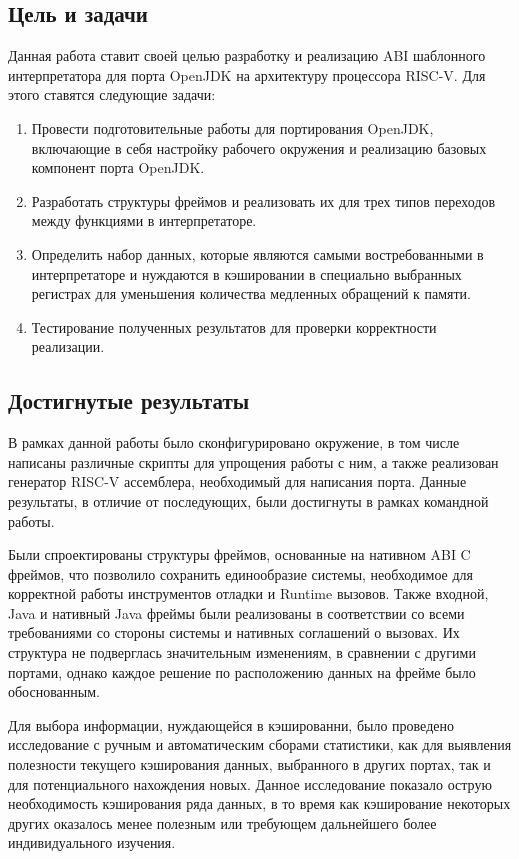 \subsection*{Цель и задачи}

Данная работа ставит своей целью разработку и реализацию ABI шаблонного интерпретатора для порта OpenJDK на архитектуру процессора RISC-V. Для этого ставятся следующие задачи:

\begin{enumerate}
    \item Провести подготовительные работы для портирования OpenJDK, включающие в себя настройку рабочего окружения и реализацию базовых компонент порта OpenJDK.
    \item Разработать структуры фреймов и реализовать их для трех типов переходов между функциями в интерпретаторе.
    \item Определить набор данных, которые являются самыми востребованными в интерпретаторе и нуждаются в кэшировании в специально выбранных регистрах для уменьшения количества медленных обращений к памяти.
    \item Тестирование полученных результатов для проверки корректности реализации.
\end{enumerate}




\subsection*{Достигнутые результаты}

В рамках данной работы было сконфигурировано окружение, в том числе написаны различные скрипты для упрощения работы с ним, а также реализован генератор RISC-V ассемблера, необходимый для написания порта. Данные результаты, в отличие от последующих, были достигнуты в рамках командной работы.

Были спроектированы структуры фреймов, основанные на нативном ABI C фреймов, что позволило сохранить единообразие системы, необходимое для корректной работы инструментов отладки и Runtime вызовов. Также входной, Java и нативный Java фреймы были реализованы в соответствии со всеми требованиями со стороны системы и нативных соглашений о вызовах. Их структура не подверглась значительным изменениям, в сравнении с другими портами, однако каждое решение по расположению данных на фрейме было обоснованным.

Для выбора информации, нуждающейся в кэшированни, было проведено исследование с ручным и автоматическим сборами статистики, как для выявления полезности текущего кэширования данных, выбранного в других портах, так и для потенциального нахождения новых. Данное исследование показало острую необходимость кэширования ряда данных, в то время как кэширование некоторых других оказалось менее полезным или требующем дальнейшего более индивидуального изучения.

